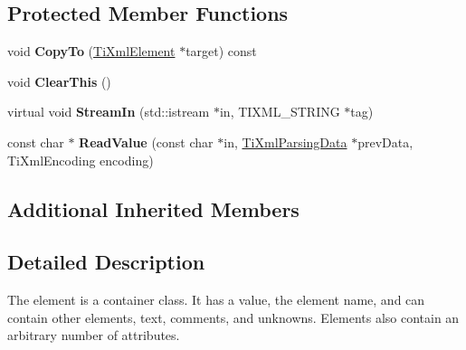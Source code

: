 \subsection*{Protected Member Functions}
\begin{DoxyCompactItemize}
\item 
\hypertarget{class_ti_xml_element_a9e0c1983b840de4134f1f6bf7af00b0f}{void {\bfseries Copy\+To} (\hyperlink{class_ti_xml_element}{Ti\+Xml\+Element} $\ast$target) const }\label{class_ti_xml_element_a9e0c1983b840de4134f1f6bf7af00b0f}

\item 
\hypertarget{class_ti_xml_element_a5670933ec2d7d9763b9891acc05d7f7d}{void {\bfseries Clear\+This} ()}\label{class_ti_xml_element_a5670933ec2d7d9763b9891acc05d7f7d}

\item 
\hypertarget{class_ti_xml_element_a6884b491fb4708dae566f3ddc1476536}{virtual void {\bfseries Stream\+In} (std\+::istream $\ast$in, T\+I\+X\+M\+L\+\_\+\+S\+T\+R\+I\+N\+G $\ast$tag)}\label{class_ti_xml_element_a6884b491fb4708dae566f3ddc1476536}

\item 
\hypertarget{class_ti_xml_element_ac786bce103042d3837c4cc2ff6967d41}{const char $\ast$ {\bfseries Read\+Value} (const char $\ast$in, \hyperlink{class_ti_xml_parsing_data}{Ti\+Xml\+Parsing\+Data} $\ast$prev\+Data, Ti\+Xml\+Encoding encoding)}\label{class_ti_xml_element_ac786bce103042d3837c4cc2ff6967d41}

\end{DoxyCompactItemize}
\subsection*{Additional Inherited Members}


\subsection{Detailed Description}
The element is a container class. It has a value, the element name, and can contain other elements, text, comments, and unknowns. Elements also contain an arbitrary number of attributes. 

